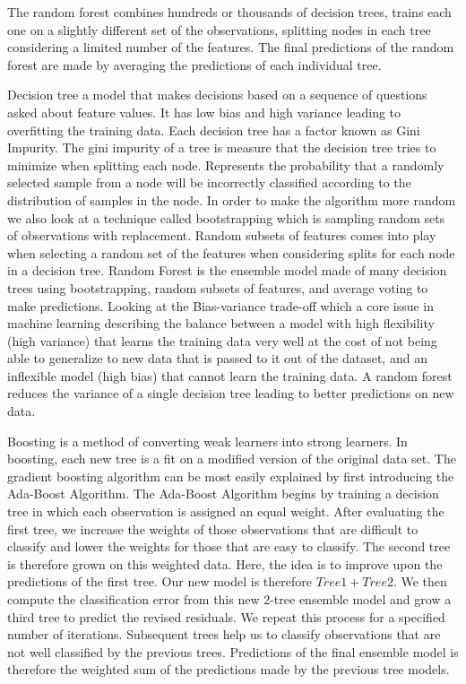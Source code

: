 \documentclass[12pt]{article}
\begin{document}
The random forest combines hundreds or thousands of decision trees, trains each one on a slightly different set of the observations, splitting nodes in each tree considering a limited number of the features. The final predictions of the random forest are made by averaging the predictions of each individual tree.

Decision tree a model that makes decisions based on a sequence of questions asked about feature values. It has low bias and high variance leading to overfitting the training data. Each decision tree has a factor known as Gini Impurity. The gini impurity of a tree is measure that the decision tree tries to minimize when splitting each node. Represents the probability that a randomly selected sample from a node will be incorrectly classified according to the distribution of samples in the node. In order to make the algorithm more random we also look at a technique called bootstrapping which is sampling random sets of observations with replacement. Random subsets of features comes into play when selecting a random set of the features when considering splits for each node in a decision tree. Random Forest is the ensemble model made of many decision trees using bootstrapping, random subsets of features, and average voting to make predictions. Looking at the Bias-variance trade-off which a core issue in machine learning describing the balance between a model with high flexibility (high variance) that learns the training data very well at the cost of not being able to generalize to new data that is passed to it out of the dataset, and an inflexible model (high bias) that cannot learn the training data. A random forest reduces the variance of a single decision tree leading to better predictions on new data.


Boosting is a method of converting weak learners into strong learners. In boosting, each new tree is a fit on a modified version of the original data set. The gradient boosting algorithm can be most easily explained by first introducing the Ada-Boost Algorithm. The Ada-Boost Algorithm begins by training a decision tree in which each observation is assigned an equal weight. After evaluating the first tree, we increase the weights of those observations that are difficult to classify and lower the weights for those that are easy to classify. The second tree is therefore grown on this weighted data. Here, the idea is to improve upon the predictions of the first tree. Our new model is therefore $Tree 1 + Tree 2$. We then compute the classification error from this new 2-tree ensemble model and grow a third tree to predict the revised residuals. We repeat this process for a specified number of iterations. Subsequent trees help us to classify observations that are not well classified by the previous trees. Predictions of the final ensemble model is therefore the weighted sum of the predictions made by the previous tree models.
\end{document}
